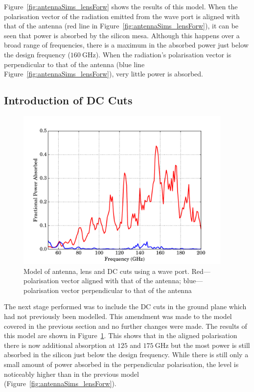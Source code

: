 \par 
Figure~\ref{fig:antennaSims_lensForw} shows the results of this model. When the polarisation vector of the radiation emitted from the wave port is aligned with that of the antenna (red line in Figure~\ref{fig:antennaSims_lensForw}), it can be seen that power is absorbed by the silicon mesa. Although this happens over a broad range of frequencies, there is a maximum in the absorbed power just below the design frequency ($160~\mathrm{GHz}$). When the radiation's polarisation vector is perpendicular to that of the antenna (blue line Figure~\ref{fig:antennaSims_lensForw}), very little power is absorbed.
%
\subsection{Introduction of DC Cuts}\label{ssec:antennaSims_cuts}
\begin{figure}[tb]
\begin{center}
\includegraphics[width = 0.95\textwidth]{figures/antennaSim_slots}
\caption[Model of antenna, lens and DC cuts using a wave port]{Model of antenna, lens and DC cuts using a wave port. Red---polarisation vector aligned with that of the antenna; blue---polarisation vector perpendicular to that of the antenna}
\label{fig:antennaSims_slots}
\end{center}
\end{figure}
The next stage performed was to include the DC cuts in the ground plane which had not previously been modelled. This amendment was made to the model covered in the previous section and no further changes were made. The results of this model are shown in Figure~\ref{fig:antennaSims_slots}. This shows that in the aligned polarisation there is now additional absorption at $125$ and $175~\mathrm{GHz}$ but the most power is still absorbed in the silicon just below the design frequency. While there is still only a small amount of power absorbed in the perpendicular polarisation, the level is noticeably higher than in the previous model (Figure~\ref{fig:antennaSims_lensForw}). 
%
